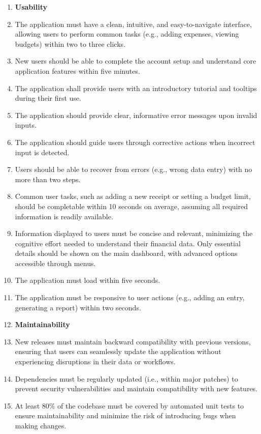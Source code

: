 \documentclass[12pt]{article}
\begin{document}
\begin{enumerate}[label=NFR\arabic*]
  \item[]\textbf{Usability}
  \item The application must have a clean, intuitive, and easy-to-navigate
  interface, allowing users to perform common tasks (e.g., adding expenses,
  viewing budgets) within two to three clicks.
  \item New users should be able to complete the account setup and understand
  core application features within five minutes.
  \item The application shall provide users with an introductory tutorial and
  tooltips during their first use.
  \item The application should provide clear, informative error messages upon invalid
  inputs.
  \item The application should guide users through corrective actions when
  incorrect input is detected.
  \item Users should be able to recover from errors (e.g., wrong data entry)
  with no more than two steps.
  \item Common user tasks, such as adding a new receipt or setting a budget
  limit, should be completable within 10 seconds on average, assuming all
  required information is readily available.
  \item Information displayed to users must be concise and relevant, minimizing
  the cognitive effort needed to understand their financial data. Only essential
  details should be shown on the main dashboard, with advanced options
  accessible through menus.
  \item The application must load within five seconds.
  \item The application must be responsive to user actions (e.g., adding an
  entry, generating a report) within two seconds.


  \item[] \textbf{Maintainability}
  \item New releases must maintain backward compatibility with previous
  versions, ensuring that users can seamlessly update the application without
  experiencing disruptions in their data or workflows.
  \item Dependencies must be regularly updated (i.e., within major patches) to
  prevent security vulnerabilities and maintain compatibility with new features.
  \item At least 80\% of the codebase must be covered by automated unit tests to
  ensure maintainability and minimize the risk of introducing bugs when making
  changes.


\end{enumerate}
\end{document}
